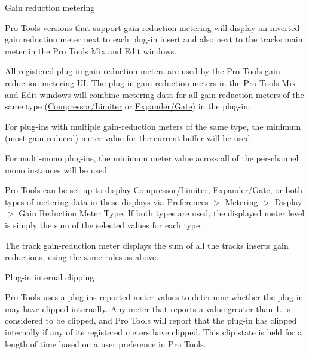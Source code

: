 \begin{DoxyItemize}
\item Gain reduction metering 

Pro Tools versions that support gain reduction metering will display an inverted gain reduction meter next to each plug-\/in insert and also next to the track\textquotesingle{}s main meter in the Pro Tools Mix and Edit windows.

All registered plug-\/in gain reduction meters are used by the Pro Tools gain-\/reduction metering UI. The plug-\/in gain reduction meters in the Pro Tools Mix and Edit windows will combine metering data for all gain-\/reduction meters of the same type (\mbox{\hyperlink{a00491_a590815545eaf0d3be0bb8f656fe2a761af93404c1998a39f398adbb788355248f}{Compressor/\+Limiter}} or \mbox{\hyperlink{a00491_a590815545eaf0d3be0bb8f656fe2a761a58188550947e94f506dc0e43fe7cf302}{Expander/\+Gate}}) in the plug-\/in\+:


\begin{DoxyItemize}
\item For plug-\/ins with multiple gain-\/reduction meters of the same type, the minimum (most gain-\/reduced) meter value for the current buffer will be used  
\item For multi-\/mono plug-\/ins, the minimum meter value across all of the per-\/channel mono instances will be used  
\end{DoxyItemize}

Pro Tools can be set up to display \mbox{\hyperlink{a00491_a590815545eaf0d3be0bb8f656fe2a761af93404c1998a39f398adbb788355248f}{Compressor/\+Limiter}}, \mbox{\hyperlink{a00491_a590815545eaf0d3be0bb8f656fe2a761a58188550947e94f506dc0e43fe7cf302}{Expander/\+Gate}}, or both types of metering data in these displays via Preferences $>$ Metering $>$ Display $>$ Gain Reduction Meter Type. If both types are used, the displayed meter level is simply the sum of the selected values for each type.

The track gain-\/reduction meter displays the sum of all the track\textquotesingle{}s inserts\textquotesingle{} gain reductions, using the same rules as above.




\item Plug-\/in internal clipping 

Pro Tools uses a plug-\/in\textquotesingle{}s reported meter values to determine whether the plug-\/in may have clipped internally. Any meter that reports a value greater than 1. is considered to be clipped, and Pro Tools will report that the plug-\/in has clipped internally if any of its registered meters have clipped. This clip state is held for a length of time based on a user preference in Pro Tools.


\end{DoxyItemize}
